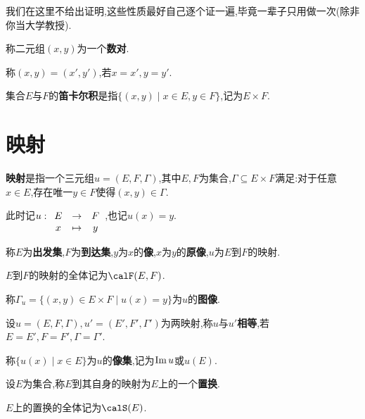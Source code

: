 我们在这里不给出证明,这些性质最好自己逐个证一遍,毕竟一辈子只用做一次(除非你当大学教授).

\begin{deff}
    称二元组$(x,y)$为一个\textbf{数对}.

    称$(x,y) = (x',y')$,若$x = x', y = y'$.
\end{deff}

\begin{deff}
    集合$E$与$F$的\textbf{笛卡尔积}是指$\{ (x,y) \mid x \in E, y \in F \}$,记为$E \times F$.
\end{deff}

\section{映射}

\begin{deff}
    \textbf{映射}是指一个三元组$u = (E, F, \Gamma)$,其中$E, F$为集合,$\Gamma \subseteq E \times F$满足:对于任意$x \in E$,存在唯一$y \in F$使得$(x, y) \in \Gamma$.

    此时记$u:\begin{array}[t]{ccc} E & \to & F \\ x & \mapsto & y \end{array}$,也记$u(x)=y$.

    称$E$为\textbf{出发集},$F$为\textbf{到达集},$y$为$x$的\textbf{像},$x$为$y$的\textbf{原像},$u$为$E$到$F$的映射.

    $E$到$F$的映射的全体记为$\calF(E,F)$.
\end{deff}

\begin{deff}
    称$\Gamma_u = \{ (x, y) \in E \times F \mid u(x) = y \}$为$u$的\textbf{图像}.
\end{deff}

\begin{deff}
    设$u = (E, F, \Gamma), u' = (E', F', \Gamma')$为两映射,称$u$与$u'$\textbf{相等},若$E = E', F = F', \Gamma = \Gamma'$.
\end{deff}

\begin{deff}
    称$\{ u(x) \mid x \in E \}$为$u$的\textbf{像集},记为$\operatorname{Im} u$或$u(E)$.
\end{deff}

\begin{deff}
    设$E$为集合,称$E$到其自身的映射为$E$上的一个\textbf{置换}.

    $E$上的置换的全体记为$\calS(E)$.
\end{deff}


